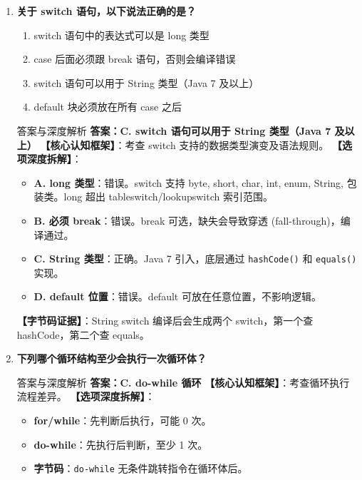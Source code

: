 \documentclass[12pt, a4paper]{ctexart}
\newcommand{\code}[1]{\texttt{\color{myblue}#1}}
\begin{document}
\begin{enumerate}[label=\arabic*.]
	\item \textbf{关于 switch 语句，以下说法正确的是？}
	      \begin{enumerate}[label=\Alph*.]
		      \item switch 语句中的表达式可以是 long 类型
		      \item case 后面必须跟 break 语句，否则会编译错误
		      \item switch 语句可以用于 String 类型（Java 7 及以上）
		      \item default 块必须放在所有 case 之后
	      \end{enumerate}
	      \begin{bluebox}{答案与深度解析}
		      \textbf{答案：C. switch 语句可以用于 String 类型（Java 7 及以上）}
		      \textbf{【核心认知框架】}：考查 switch 支持的数据类型演变及语法规则。
		      \textbf{【选项深度拆解】}：
		      \begin{itemize}[leftmargin=*, nosep]
			      \item \textbf{A. long 类型}：错误。switch 支持 byte, short, char, int, enum, String, 包装类。long 超出 tableswitch/lookupswitch 索引范围。
			      \item \textbf{B. 必须 break}：错误。break 可选，缺失会导致穿透 (fall-through)，编译通过。
			      \item \textbf{C. String 类型}：正确。Java 7 引入，底层通过 \code{hashCode()} 和 \code{equals()} 实现。
			      \item \textbf{D. default 位置}：错误。default 可放在任意位置，不影响逻辑。
		      \end{itemize}
		      \textbf{【字节码证据】}：String switch 编译后会生成两个 switch，第一个查 hashCode，第二个查 equals。
	      \end{bluebox}

	\item \textbf{下列哪个循环结构至少会执行一次循环体？}
	      \begin{bluebox}{答案与深度解析}
		      \textbf{答案：C. do-while 循环}
		      \textbf{【核心认知框架】}：考查循环执行流程差异。
		      \textbf{【选项深度拆解】}：
		      \begin{itemize}[leftmargin=*, nosep]
			      \item \textbf{for/while}：先判断后执行，可能 0 次。
			      \item \textbf{do-while}：先执行后判断，至少 1 次。
			      \item \textbf{字节码}：\code{do-while} 无条件跳转指令在循环体后。
		      \end{itemize}
	      \end{bluebox}


\end{enumerate}
\end{document}
